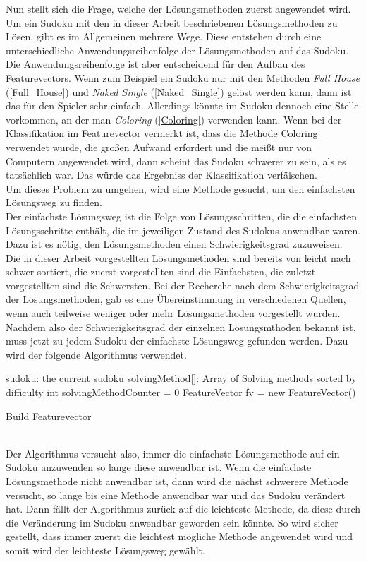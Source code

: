 Nun stellt sich die Frage, welche der Lösungsmethoden zuerst angewendet wird. Um ein Sudoku mit den in dieser Arbeit beschriebenen Lösungsmethoden zu Lösen, gibt es im Allgemeinen mehrere Wege. Diese entstehen durch eine unterschiedliche Anwendungsreihenfolge der Lösungsmethoden auf das Sudoku. Die Anwendungsreihenfolge ist aber entscheidend für den Aufbau des Featurevectors. Wenn zum Beispiel ein Sudoku nur mit den Methoden \textit{Full House} (\ref{Full_House}) und \textit{Naked Single} (\ref{Naked_Single}) gelöst werden kann, dann ist das für den Spieler sehr einfach. Allerdings könnte im Sudoku dennoch eine Stelle vorkommen, an der man \textit{Coloring} (\ref{Coloring}) verwenden kann. Wenn bei der Klassifikation im Featurevector vermerkt ist, dass die Methode Coloring verwendet wurde, die großen Aufwand erfordert und die meißt nur von Computern angewendet wird, dann scheint das Sudoku schwerer zu sein, als es tatsächlich war. Das würde das Ergebniss der Klassifikation verfälschen.\\
Um dieses Problem zu umgehen, wird eine Methode gesucht, um den einfachsten Lösungsweg zu finden.\\
Der einfachste Lösungsweg ist die Folge von Lösungsschritten, die die einfachsten Lösungsschritte enthält, die im jeweiligen Zustand des Sudokus anwendbar waren. Dazu ist es nötig, den Lösungsmethoden einen Schwierigkeitsgrad zuzuweisen. \\
Die in dieser Arbeit vorgestellten Lösungsmethoden sind bereits von leicht nach schwer sortiert, die zuerst vorgestellten sind die Einfachsten, die zuletzt vorgestellten sind die Schwersten. Bei der Recherche nach dem Schwierigkeitsgrad der Lösungsmethoden, gab es eine Übereinstimmung in verschiedenen Quellen, wenn auch teilweise weniger oder mehr Lösungsmethoden vorgestellt wurden.\cite{diff1}\cite{diff4}\cite{diff2}\cite{diff3}\\
Nachdem also der Schwierigkeitsgrad der einzelnen Lösungsmthoden bekannt ist, muss jetzt zu jedem Sudoku der einfachste Lösungsweg gefunden werden. Dazu wird der folgende Algorithmus verwendet.\\

\begin{algorithm}[H]
 sudoku: the current sudoku\;
 solvingMethod[]: Array of Solving methods sorted by difficulty\;
 int solvingMethodCounter = 0\;
 FeatureVector fv = new FeatureVector()\;
 \caption{Build Featurevector}
\end{algorithm}
\mbox{} \\
Der Algorithmus versucht also, immer die einfachste Lösungsmethode auf ein Sudoku anzuwenden so lange diese anwendbar ist. Wenn die einfachste Lösungsmethode nicht anwendbar ist, dann wird die nächst schwerere Methode versucht, so lange bis eine Methode anwendbar war und das Sudoku verändert hat. Dann fällt der Algorithmus zurück auf die leichteste Methode, da diese durch die Veränderung im Sudoku anwendbar geworden sein könnte. So wird sicher gestellt, dass immer zuerst die leichtest mögliche Methode angewendet wird und somit wird der leichteste Lösungsweg gewählt.